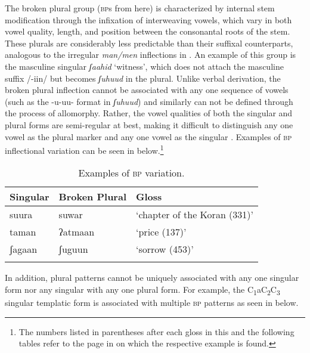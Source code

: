 \documentclass[output=paper,modfonts]{langscibook}
\begin{document}
The broken plural group (\textsc{bp}s from here) is characterized by internal stem modification through the infixation of interweaving vowels, which vary in both vowel quality, length, and position between the consonantal roots of the stem. These plurals are considerably less predictable than their suffixal counterparts, analogous to the irregular \textit{man/men} inflections in . An example of this group is the masculine singular  \textit{ʃaahid} ‘witness’, which does not attach the masculine suffix /-iin/ but becomes \textit{ʃuhuud} in the plural. Unlike verbal derivation, the broken plural inflection cannot be associated with any one sequence of vowels (such as the -u-uu- format in \textit{ʃuhuud}) and similarly can not be defined through the process of allomorphy. Rather, the vowel qualities of both the singular and plural forms are semi-regular at best, making it difficult to distinguish any one vowel as the plural marker and any one vowel as the singular \citep[70]{Kihm2006}. Examples of \textsc{bp} inflectional variation can be seen in  below.\footnote{The numbers listed in parentheses after each gloss in this and the following tables refer to the page in \citet{Badawi1986} on which the respective example is found.}

\begin{table}
\begin{tabularx}{\textwidth}{XXl}
\lsptoprule
Singular & Broken Plural & Gloss\\
\midrule
suura & suwar & ‘chapter of the Koran (331)’\\
taman & ʔatmaan & ‘price (137)’\\
ʃagaan & ʃuguun & ‘sorrow (453)’\\
\lspbottomrule
\end{tabularx}
\caption{Examples of \textsc{bp} variation.}
\label{tab:winchester:1}
\end{table}

In addition, plural patterns cannot be uniquely associated with any one singular form nor any singular with any one plural form. For example, the C\textsubscript{1}aC\textsubscript{2}C\textsubscript{3} singular templatic form is associated with multiple \textsc{bp} patterns as seen in  below. 
\end{document}
